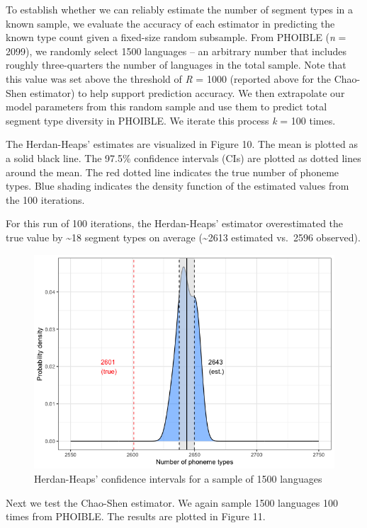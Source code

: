 \documentclass[
]{article}
\begin{document}
To establish whether we can reliably estimate the number of segment
types in a known sample, we evaluate the accuracy of each estimator in
predicting the known type count given a fixed-size random subsample.
From PHOIBLE (\emph{n} = 2099), we randomly select 1500 languages -- an
arbitrary number that includes roughly three-quarters the number of
languages in the total sample. Note that this value was set above the
threshold of \emph{R} = 1000 (reported above for the Chao-Shen
estimator) to help support prediction accuracy. We then extrapolate our
model parameters from this random sample and use them to predict total
segment type diversity in PHOIBLE. We iterate this process \emph{k} =
100 times.

The Herdan-Heaps' estimates are visualized in Figure 10. The mean is
plotted as a solid black line. The 97.5\% confidence intervals (CIs) are
plotted as dotted lines around the mean. The red dotted line indicates
the true number of phoneme types. Blue shading indicates the density
function of the estimated values from the 100 iterations.

For this run of 100 iterations, the Herdan-Heaps' estimator
overestimated the true value by \textasciitilde18 segment types on
average (\textasciitilde2613 estimated vs.~2596 observed).

\begin{figure}

{\centering \includegraphics[width=0.8\linewidth]{README_files/figure-gfm/herdan_heaps_ci-1} 

}

\caption{\label{fig:herdan_heaps_ci}Herdan-Heaps' confidence intervals for a sample of 1500 languages}\label{fig:hh_ci}
\end{figure}

Next we test the Chao-Shen estimator. We again sample 1500 languages 100
times from PHOIBLE. The results are plotted in Figure 11.
\end{document}
